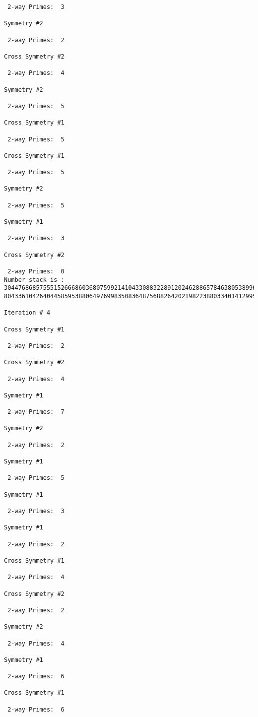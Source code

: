 \begin{verbatim}
 2-way Primes: 	3

Symmetry #2

 2-way Primes: 	2

Cross Symmetry #2

 2-way Primes: 	4

Symmetry #2

 2-way Primes: 	5

Cross Symmetry #1

 2-way Primes: 	5

Cross Symmetry #1

 2-way Primes: 	5

Symmetry #2

 2-way Primes: 	5

Symmetry #1

 2-way Primes: 	3

Cross Symmetry #2

 2-way Primes: 	0
Number stack is :
30447686857555152666860368075992141043308832289120246288657846380538996794608835958544046240163340857
80433610426404458595388064976998350836487568826420219822388033401412995708630686662515557586867440375

Iteration #	4

Cross Symmetry #1

 2-way Primes: 	2

Cross Symmetry #2

 2-way Primes: 	4

Symmetry #1

 2-way Primes: 	7

Symmetry #2

 2-way Primes: 	2

Symmetry #1

 2-way Primes: 	5

Symmetry #1

 2-way Primes: 	3

Symmetry #1

 2-way Primes: 	2

Cross Symmetry #1

 2-way Primes: 	4

Cross Symmetry #2

 2-way Primes: 	2

Symmetry #2

 2-way Primes: 	4

Symmetry #1

 2-way Primes: 	6

Cross Symmetry #1

 2-way Primes: 	6


\end{verbatim}
